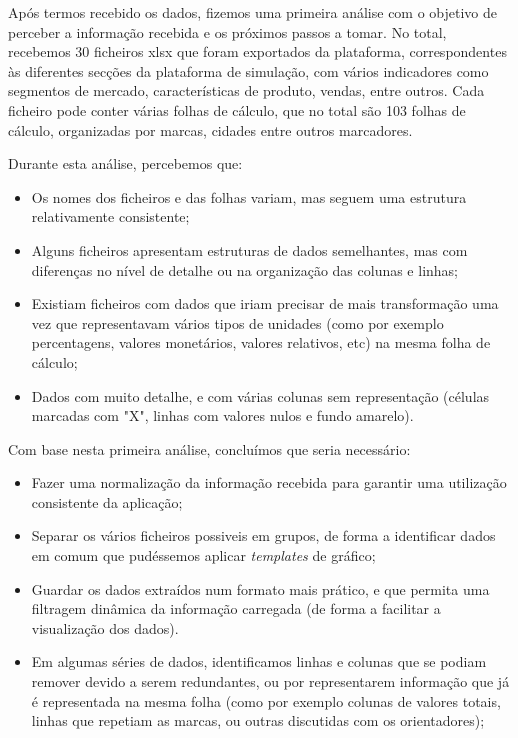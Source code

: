 Após termos recebido os dados, fizemos uma primeira análise com o objetivo de perceber a informação recebida e os próximos passos a tomar. No total, recebemos 30 ficheiros \gls{xlsx} que foram exportados da plataforma, correspondentes às diferentes secções da plataforma de simulação, com vários indicadores como segmentos de mercado, características de produto, vendas, entre outros. Cada ficheiro pode conter várias folhas de cálculo, que no total são 103 folhas de cálculo, organizadas por marcas, cidades entre outros marcadores.

Durante esta análise, percebemos que:

\begin{itemize}
    \item Os nomes dos ficheiros e das folhas variam, mas seguem uma estrutura relativamente consistente;
    \item Alguns ficheiros apresentam estruturas de dados semelhantes, mas com diferenças no nível de detalhe ou na organização das colunas e linhas;
    \item Existiam ficheiros com dados que iriam precisar de mais transformação uma vez que representavam vários tipos de unidades (como por exemplo percentagens, valores monetários, valores relativos, etc) na mesma folha de cálculo;
    \item Dados com muito detalhe, e com várias colunas sem representação (células marcadas com "X", linhas com valores nulos e fundo amarelo).
\end{itemize}

Com base nesta primeira análise, concluímos que seria necessário:
\begin{itemize}
    \item Fazer uma normalização da informação recebida para garantir uma utilização consistente da aplicação;
    \item Separar os vários ficheiros possiveis em grupos, de forma a identificar dados em comum que pudéssemos aplicar \textit{templates} de gráfico;
    \item Guardar os dados extraídos num formato mais prático, e que permita uma filtragem dinâmica da informação carregada (de forma a facilitar a visualização dos dados).
    \item Em algumas séries de dados, identificamos linhas e colunas que se podiam remover devido a serem redundantes, ou por representarem informação que já é representada na mesma folha (como por exemplo colunas de valores totais, linhas que repetiam as marcas, ou outras discutidas com os orientadores);
\end{itemize}

